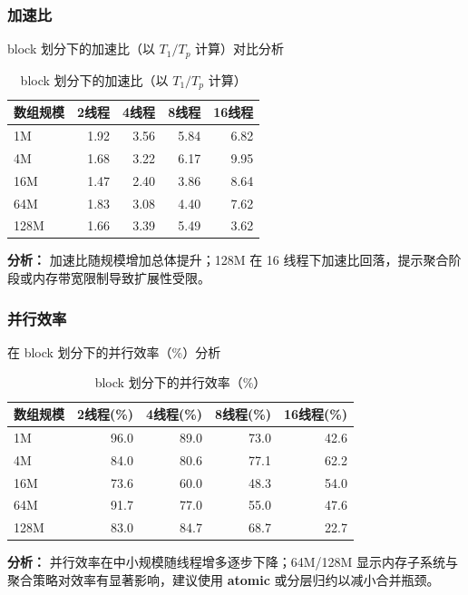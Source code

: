 \documentclass{SYSUReport}
\begin{document}
\subsubsection{加速比}

block 划分下的加速比（以 $T_1/T_p$ 计算）对比分析

\begin{table}[H]
\centering
\caption{block 划分下的加速比（以 $T_1/T_p$ 计算）}
\begin{tabular}{lrrrr}
\toprule
数组规模 & 2线程 & 4线程 & 8线程 & 16线程 \\
\midrule
1M  & 1.92 & 3.56 & 5.84 & 6.82 \\
4M  & 1.68 & 3.22 & 6.17 & 9.95 \\
16M & 1.47 & 2.40 & 3.86 & 8.64 \\
64M & 1.83 & 3.08 & 4.40 & 7.62 \\
128M& 1.66 & 3.39 & 5.49 & 3.62 \\
\bottomrule
\end{tabular}
\end{table}

\textbf{分析：} 加速比随规模增加总体提升；128M 在 16 线程下加速比回落，提示聚合阶段或内存带宽限制导致扩展性受限。

\subsubsection{并行效率}

在 block 划分下的并行效率（\%）分析

\begin{table}[H]
\centering
\caption{block 划分下的并行效率（\%）}
\begin{tabular}{lrrrr}
\toprule
数组规模 & 2线程(\%) & 4线程(\%) & 8线程(\%) & 16线程(\%) \\
\midrule
1M   & 96.0 & 89.0 & 73.0 & 42.6 \\
4M   & 84.0 & 80.6 & 77.1 & 62.2 \\
16M  & 73.6 & 60.0 & 48.3 & 54.0 \\
64M  & 91.7 & 77.0 & 55.0 & 47.6 \\
128M & 83.0 & 84.7 & 68.7 & 22.7 \\
\bottomrule
\end{tabular}
\end{table}

\textbf{分析：} 并行效率在中小规模随线程增多逐步下降；64M/128M 显示内存子系统与聚合策略对效率有显著影响，建议使用 \textbf{atomic} 或分层归约以减小合并瓶颈。
\end{document}
